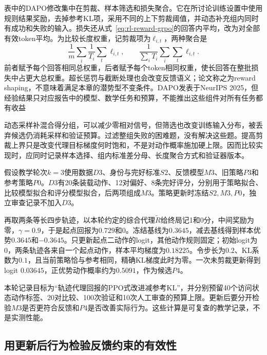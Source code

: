 表中的DAPO修改集中在剪裁、样本筛选和损失聚合。它在所讨论训练设置中使用规则结果奖励，去掉参考KL项，采用不同的上下剪裁阈值，并动态补充组内同时有成功和失败的输入。损失还从式~\eqref{eq:rl-reward-grpo}的回答内平均，改为对全部有效token平均。为比较长度权重，记剪裁项为$\ell_{i,t}$，两种聚合是
\begin{equation}
  \frac1m\sum_i\frac1{T_i}\sum_t\ell_{i,t},
  \qquad
  \frac1{\sum_iT_i}\sum_i\sum_t\ell_{i,t}.
  \label{eq:rl-reward-dapo-weight}
\end{equation}
前者赋予每个回答相同总权重，后者赋予每个token相同权重，使长回答在整批损失中占更大总权重。超长惩罚与截断处理也会改变反馈语义；论文称之为reward shaping，不意味着满足本章的潜势型不变条件。DAPO发表于NeurIPS 2025，但经验结果只对应报告中的模型、数学任务和预算，不能推出这些组件对所有任务都有收益

动态采样补混合得分组，可以减少零相对信号，但筛选也改变训练输入分布，被丢弃候选仍消耗采样和验证预算。过滤整组失败的困难题，没有解决这些题。提高剪裁上界只是改变代理目标梯度何时饱和，不是对动作概率施加硬上限。因而比较实现时，应同时记录样本选择、组内标准差分母、长度聚合方式和验证器版本。

\begin{example}[一轮可复查的更新记录]
  \label{ex:rl-reward-round}
  假设教学轮次$k=3$使用数据$D3$、身份与完好标准$S2$、反馈模型$M3$、旧策略$P3$和参考策略$P0$。$D3$有20条装载动作、12对偏好、8条完好评分，分别用于策略拟合、比较模型拟合和评分模型拟合，后两项组成$M3$。策略更新时冻结$S2,M3,P0$，独立审查记录不加入$D3$。

  再取两条等长四步轨迹，以本轮约定的综合代理$\widetilde R$给终局记1和0分，中间奖励为零，$\gamma=0.9$，于是起点回报为$0.729$和0。冻结基线为$0.3645$，减去基线得到样本优势$0.3645$和$-0.3645$。只更新起点二动作的logit，其他动作规则固定；初始logit为0，两条轨迹各来自一个起点动作，样本平均梯度为$0.18225$。令步长为$0.2$、KL系数为$0.1$，且当前策略恰与参考相同，精确KL梯度此时为零。一次未剪裁更新得到logit $0.03645$，正优势动作概率约为$0.5091$，作为候选$P4$。

  本轮记录目标为“轨迹代理回报的PPO式改进减参考KL”，并分别预留40个访问状态动作标签、20对比较、100次验证和10次人工审查的预算上限。更新后要分开检验$M3$是否更符合反馈和$P4$是否改善实际行为。这些计算是可复查的教学记录，不是实测性能。
\end{example}

\subsection{用更新后行为检验反馈约束的有效性}
\label{sec:rl-reward-loop-check}

